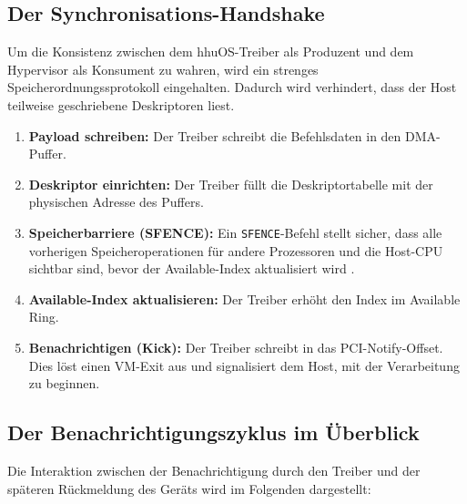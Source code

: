 \subsection{Der Synchronisations-Handshake}
Um die Konsistenz zwischen dem hhuOS-Treiber als Produzent und dem Hypervisor
als Konsument zu wahren, wird ein strenges Speicherordnungssprotokoll
eingehalten. Dadurch wird verhindert, dass der Host teilweise geschriebene
Deskriptoren liest.

\begin{enumerate}[label=\arabic*.]
    \item \textbf{Payload schreiben:} Der Treiber schreibt die Befehlsdaten in den DMA-Puffer.
    \item \textbf{Deskriptor einrichten:} Der Treiber füllt die Deskriptortabelle mit der physischen Adresse des Puffers.
    \item \textbf{Speicherbarriere (SFENCE):} Ein \texttt{SFENCE}-Befehl stellt sicher, dass alle vorherigen Speicheroperationen für andere Prozessoren und die Host-CPU sichtbar sind, bevor der Available-Index aktualisiert wird \cite{Virtio12}.
    \item \textbf{Available-Index aktualisieren:} Der Treiber erhöht den Index im Available Ring.
    \item \textbf{Benachrichtigen (Kick):} Der Treiber schreibt in das PCI-Notify-Offset. Dies löst einen VM-Exit aus und signalisiert dem Host, mit der Verarbeitung zu beginnen.
\end{enumerate}

\subsection{Der Benachrichtigungszyklus im Überblick}
Die Interaktion zwischen der Benachrichtigung durch den Treiber und der
späteren Rückmeldung des Geräts wird im Folgenden dargestellt:

